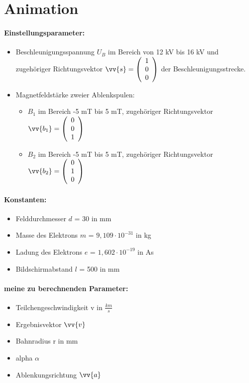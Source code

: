 \section{Animation}

\paragraph{Einstellungsparameter:}

\begin{itemize}
    \item Beschleunigungsspannung $U_B$ im Bereich von 12 kV bis 16 kV und  zugehöriger Richtungsvektor $\vv{s} = \vektor{1}{0}{0}$ der Beschleunigungsstrecke.
    \item Magnetfeldstärke zweier Ablenkspulen:
    
    \begin{itemize}
        \item $B_1$ im Bereich -5 mT bis 5 mT, zugehöriger Richtungsvektor $\vv{b_1} = \vektor{0}{0}{1}$ %
        \item $B_2$ im Bereich -5 mT bis 5 mT, zugehöriger Richtungsvektor $\vv{b_2} = \vektor{0}{1}{0}$ %
    \end{itemize}

\end{itemize}

\paragraph{Konstanten:}

\begin{itemize}
    \item Felddurchmesser $d$ = 30 in mm
    \item Masse des Elektrons $m$ =  $9,109 \cdot 10^{-31}$ in kg
    \item Ladung des Elektrons $e$ = $1,602 \cdot 10^{-19}$ in As
    \item Bildschirmabstand $l$ = 500 in mm
\end{itemize}

\paragraph{meine zu berechnenden Parameter:}

\begin{itemize}
    \item Teilchengeschwindigkeit v in $\frac{km}{s}$
    \item Ergebnisvektor $\vv{v}$
    \item Bahnradius r in mm 
    \item alpha $\alpha$
    \item Ablenkungsrichtung $\vv{a}$
\end{itemize}

